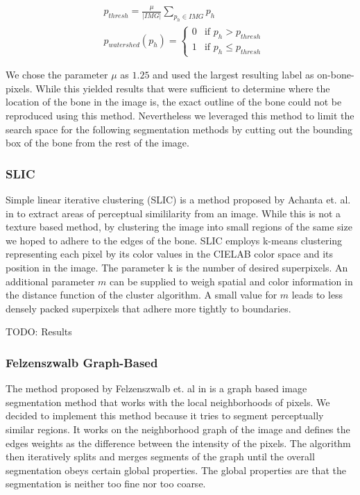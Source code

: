 \documentclass[pdftex,12pt,a4paper]{report}
\begin{document}
\begin{equation}
\begin{split}
& p_{thresh} = \frac{\mu}{|IMG|} \sum_{p_h \in IMG} p_h \\
& p_{watershed}(p_h) = \begin{cases} 0 & \text{if } p_h > p_{thresh} \\ 1 & \text{if } p_h \leq p_{thresh} \end{cases}
\end{split}
\end{equation}

We chose the parameter $\mu$ as $1.25$ and used the largest resulting label as on-bone-pixels. While this yielded results that were sufficient to determine where the  location of the bone in the image is, the exact outline of the bone could not be reproduced using this method. Nevertheless we leveraged this method to limit the search space for the following segmentation methods by cutting out the bounding box of the bone from the rest of the image.

\subsubsection{SLIC}

Simple linear iterative clustering (SLIC) is a method proposed by Achanta et. al. in \cite{achanta2012slic} to extract areas of perceptual simililarity from an image. While this is not a texture based method, by clustering the image into small regions of the same size we hoped to adhere to the edges of the bone. SLIC employs k-means clustering representing each pixel by its color values in the CIELAB color space and its position in the image. The parameter k is the number of desired superpixels. An additional parameter $m$ can be supplied to weigh spatial and color information in the distance function of the cluster algorithm. A small value for $m$ leads to less densely packed superpixels that adhere more tightly to boundaries.

TODO: Results

\subsubsection{Felzenszwalb Graph-Based}

The method proposed by Felzenszwalb et. al in \cite{felzenszwalb2004efficient} is a graph based image segmentation method that works with the local neighborhoods of pixels. We decided to implement this method because it tries to segment perceptually similar regions. It works on the neighborhood graph of the image and defines the edges weights as the difference between the intensity of the pixels. The algorithm then iteratively splits and merges segments of the graph until the overall segmentation obeys certain global properties. The global properties are that the segmentation is neither too fine nor too coarse.
\end{document}
